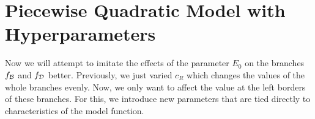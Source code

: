 \section{Piecewise Quadratic Model with Hyperparameters}

Now we will attempt to imitate the effects of the parameter $E_0$ on the branches $f_{\mathcal{B}}$ and $f_{\mathcal{D}}$ better.
Previously, we just varied $c_R$ which changes the values of the whole branches evenly.
Now, we only want to affect the value at the left borders of these branches.
For this, we introduce new parameters that are tied directly to characteristics of the model function.




